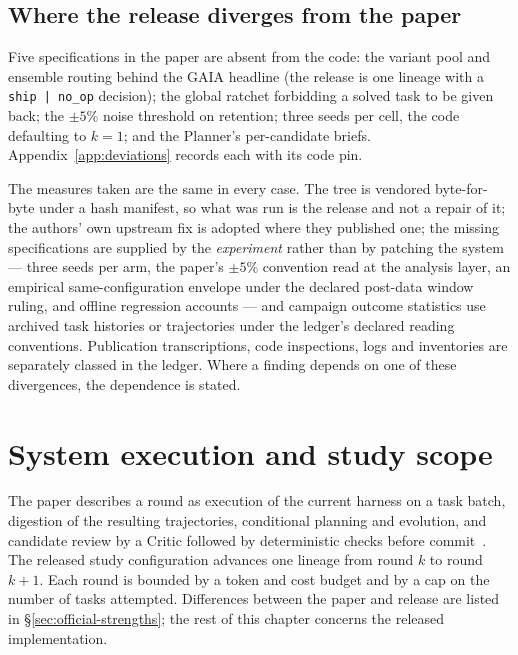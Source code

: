\subsection*{Where the release diverges from the paper}

Five specifications in the paper are absent from the code: the variant
pool and ensemble routing behind the GAIA headline (the release is one
lineage with a \texttt{ship\,|\,no\_op} decision); the global ratchet
forbidding a solved task to be given back; the $\pm 5\%$ noise threshold on
retention; three seeds per cell, the code defaulting to $k{=}1$; and the
Planner's per-candidate briefs. Appendix~\ref{app:deviations} records each
with its code pin.

The measures taken are the same in every case. The tree is vendored
byte-for-byte under a hash manifest, so what was run is the release and not
a repair of it; the authors' own upstream fix is adopted where they
published one; the missing specifications are supplied by the
\emph{experiment} rather than by patching the system --- three seeds per arm, the paper's $\pm5\%$ convention read at the analysis
layer, an empirical same-configuration envelope under the declared post-data
window ruling, and offline regression accounts --- and campaign outcome statistics use archived task histories or trajectories
under the ledger's declared reading conventions. Publication transcriptions,
code inspections, logs and inventories are separately classed in the ledger. Where a finding depends on one of these
divergences, the dependence is stated.

\section{System execution and study scope}
\label{sec:fielded}

The paper describes a round as execution of the current harness on a task
batch, digestion of the resulting trajectories, conditional planning and
evolution, and candidate review by a Critic followed by deterministic checks
before commit~\cite{aegis}. The released study configuration advances one lineage from round $k$ to
round $k+1$. Each round is bounded by a token and cost budget and by a cap on the
number of tasks attempted. Differences between the paper and release are
listed in \S\ref{sec:official-strengths}; the rest of this chapter concerns
the released implementation.

